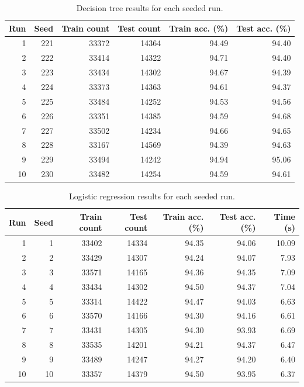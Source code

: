 \documentclass[12pt]{article}
\begin{document}
\begin{table}[H]
\centering
\caption{Decision tree results for each seeded run.}
\begin{tabular}{rrrrrr}
\hline
Run & Seed & Train count & Test count & Train acc. (\%) & Test acc. (\%) \\
\hline
1  & 221 & 33372 & 14364 & 94.49 & 94.40 \\
2  & 222 & 33414 & 14322 & 94.71 & 94.40 \\
3  & 223 & 33434 & 14302 & 94.67 & 94.39 \\
4  & 224 & 33373 & 14363 & 94.61 & 94.37 \\
5  & 225 & 33484 & 14252 & 94.53 & 94.56 \\
6  & 226 & 33351 & 14385 & 94.59 & 94.68 \\
7  & 227 & 33502 & 14234 & 94.66 & 94.65 \\
8  & 228 & 33167 & 14569 & 94.39 & 94.63 \\
9  & 229 & 33494 & 14242 & 94.94 & 95.06 \\
10 & 230 & 33482 & 14254 & 94.59 & 94.61 \\
\hline
\end{tabular}
\end{table}

\begin{table}[H]
\centering
\caption{Logistic regression results for each seeded run.}
\begin{tabular}{rrrrrrr}
\hline
Run & Seed & Train count & Test count & Train acc. (\%) & Test acc. (\%) & Time (s) \\
\hline
1  & 1  & 33402 & 14334 & 94.35 & 94.06 & 10.09 \\
2  & 2  & 33429 & 14307 & 94.24 & 94.07 & 7.93 \\
3  & 3  & 33571 & 14165 & 94.36 & 94.35 & 7.09 \\
4  & 4  & 33434 & 14302 & 94.50 & 94.37 & 7.04 \\
5  & 5  & 33314 & 14422 & 94.47 & 94.03 & 6.63 \\
6  & 6  & 33570 & 14166 & 94.30 & 94.16 & 6.61 \\
7  & 7  & 33431 & 14305 & 94.30 & 93.93 & 6.69 \\
8  & 8  & 33535 & 14201 & 94.21 & 94.37 & 6.47 \\
9  & 9  & 33489 & 14247 & 94.27 & 94.20 & 6.40 \\
10 & 10 & 33357 & 14379 & 94.50 & 93.95 & 6.37 \\
\hline
\end{tabular}
\end{table}
\end{document}
